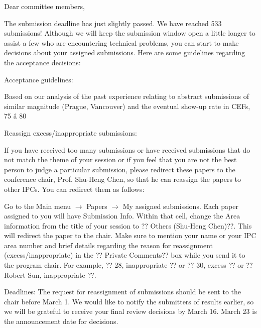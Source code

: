 \documentclass[12pt]{article}
\begin{document}
Dear committee members, 

The submission deadline has just slightly passed.  We have reached 533 submissions!  Although we will keep the submission window open a little longer to assist a few who are encountering technical problems, you can start to make decisions about your assigned submissions. Here are some guidelines regarding the acceptance decisions:

Acceptance guidelines:

Based on our analysis of the past experience relating to abstract submissions of similar magnitude (Prague, Vancouver) and the eventual show-up rate in CEFs, 75 â 80%

Reassign excess/inappropriate submissions: 

If you have received too many submissions or have received submissions that do not match the theme of your session or if you feel that you are not the best person to judge a particular submission, please redirect these papers to the conference chair, Prof. Shu-Heng Chen, so that he can reassign the papers to other IPCs. You can redirect them as follows:

Go to the Main menu $\rightarrow$  Papers $\rightarrow$ My assigned submissions. Each paper assigned to you will have Submission Info. 
Within that cell, change the Area information from the title of your session to ?? Others (Shu-Heng Chen)??. This will redirect the paper to the chair.  
Make sure to mention your name or your IPC area number and brief details regarding the reason for reassignment (excess/inappropriate) in the ?? Private Comments?? box while you send it to the program chair. For example,  ?? 28, inappropriate ?? or ?? 30, excess ?? or  ??Robert Sun, inappropriate ??. 

Deadlines: 
The request for reassignment of submissions should be sent to the chair before March 1.
We would like to notify the submitters of results earlier, so we will be grateful to receive your final review decisions by March 16. 
March 23 is the announcement date for decisions.
\end{document}
